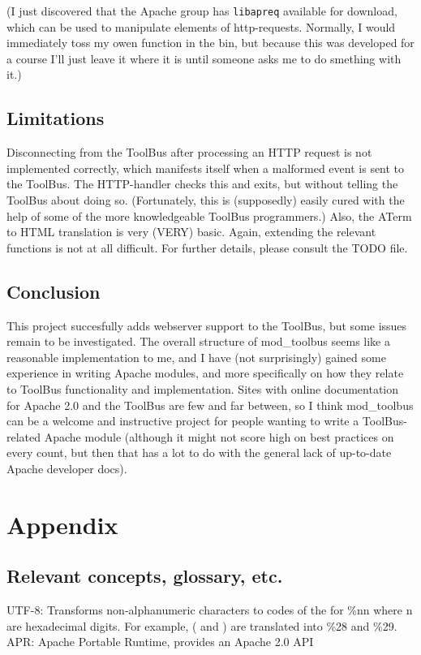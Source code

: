 \documentclass[a4paper,10pt]{article}
\begin{document}
(I just discovered that the Apache group has \texttt{libapreq} available for download, which can be used to manipulate elements of http-requests. Normally, I would immediately toss my owen function in the bin, but because this was developed for a course I'll just leave it where it is until someone asks me to do smething with it.)


\subsection{Limitations}
Disconnecting from the ToolBus after processing an HTTP request is not implemented correctly, which manifests itself when a malformed event is sent to the ToolBus. The HTTP-handler checks this and exits, but without telling the ToolBus about doing so. (Fortunately, this is (supposedly) easily cured with the help of some of the more knowledgeable ToolBus programmers.) Also, the ATerm to HTML translation is very (VERY) basic. Again, extending the relevant functions is not at all difficult. For further details, please consult the TODO file.

\subsection{Conclusion}
This project succesfully adds webserver support to the ToolBus, but some issues remain to be investigated. The overall structure of mod\_toolbus seems like a reasonable implementation to me, and I have (not surprisingly) gained some experience in writing Apache modules, and more specifically on how they relate to ToolBus functionality and implementation. Sites with online documentation for Apache 2.0 and the ToolBus are few and far between, so I think mod\_toolbus can be a welcome and instructive project for people wanting to write a ToolBus-related Apache module (although it might not score high on best practices on every count, but then that has a lot to do with the general lack of up-to-date Apache developer docs).


\section{Appendix}
\subsection{Relevant concepts, glossary, etc.}
UTF-8: Transforms non-alphanumeric characters to codes of the for \%nn where n are hexadecimal digits. For example, ( and ) are translated into \%28 and \%29.\\
APR: Apache Portable Runtime, provides an Apache 2.0 API
\end{document}

